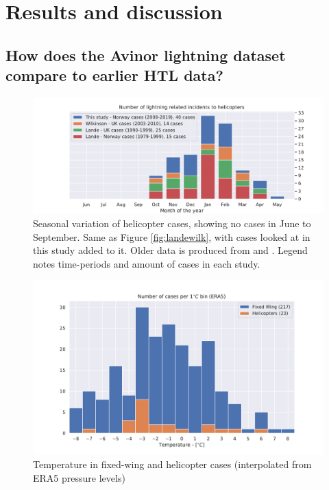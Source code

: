 \chapter{Results and discussion}

\section{How does the Avinor lightning dataset compare to earlier HTL data?}

\begin{figure}
    \centering
    \includegraphics[width=\textwidth]{Figures/yearlydistribution.pdf}
    \caption{Seasonal variation of helicopter cases, showing no cases in June to September. Same as Figure \ref{fig:landewilk}, with cases looked at in this study added to it. Older data is produced from \cite{lande1999} and \cite{wilkinson2013}. Legend notes time-periods and amount of cases in each study. }
    \label{fig:yearlyvariation}
\end{figure}

\begin{figure}
    \centering
    \includegraphics[width=\textwidth]{Figures/temperature.pdf}
    \caption{Temperature in fixed-wing and helicopter cases (interpolated from ERA5 pressure levels)}
    \label{fig:temperatureera5}
\end{figure}

